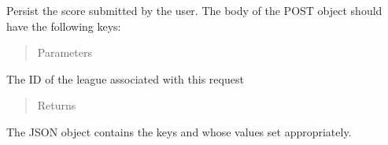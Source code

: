 \documentclass[letterpaper,10pt,english]{sphinxmanual}
\begin{document}
\begin{fulllineitems}
\label{\detokenize{tiger_leagues/readme:tiger_leagues.league.process_score_submit}}
Persist the score submitted by the user. The body of the POST object should 
have the following keys: 
\begin{quote}\begin{description}
\item[{Parameters}] \leavevmode
{} \textendash{} 

\end{description}\end{quote}

The ID of the league associated with this request
\begin{quote}\begin{description}
\item[{Returns}] \leavevmode
{}

\end{description}\end{quote}

The JSON object contains the keys  and  whose values 
set appropriately.

\end{fulllineitems}

\end{document}
